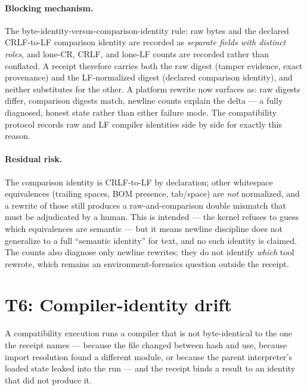 \paragraph{Blocking mechanism.} The byte-identity-versus-comparison-identity rule: raw bytes and the declared CRLF-to-LF comparison identity are recorded as \emph{separate fields with distinct roles}, and lone-CR, CRLF, and lone-LF counts are recorded rather than conflated. A receipt therefore carries both the raw digest (tamper evidence, exact provenance) and the LF-normalized digest (declared comparison identity), and neither substitutes for the other. A platform rewrite now surfaces as: raw digests differ, comparison digests match, newline counts explain the delta --- a fully diagnosed, honest state rather than either failure mode. The compatibility protocol records raw and LF compiler identities side by side for exactly this reason.

\paragraph{Residual risk.} The comparison identity is CRLF-to-LF by declaration; other whitespace equivalences (trailing spaces, BOM presence, tab/space) are \emph{not} normalized, and a rewrite of those still produces a raw-and-comparison double mismatch that must be adjudicated by a human. This is intended --- the kernel refuses to guess which equivalences are semantic --- but it means newline discipline does not generalize to a full ``semantic identity'' for text, and no such identity is claimed. The counts also diagnose only newline rewrites; they do not identify \emph{which} tool rewrote, which remains an environment-forensics question outside the receipt.

\section{T6: Compiler-identity drift}\label{threat:t6}

\begin{threat}\label{threat:thr:compdrift}
A compatibility execution runs a compiler that is not byte-identical to the one the receipt names --- because the file changed between hash and use, because import resolution found a different module, or because the parent interpreter's loaded state leaked into the run --- and the receipt binds a result to an identity that did not produce it.
\end{threat}

